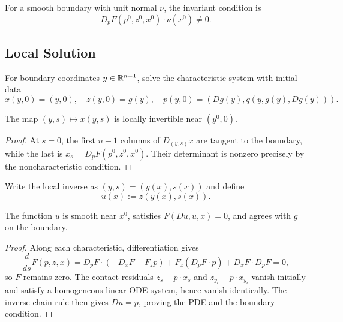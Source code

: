 \begin{remark}
\label{rem:noncharacteristic-condition-general}

For a smooth boundary with unit normal $\nu$, the invariant condition is
\[
D_pF(p^0,z^0,x^0)\cdot\nu(x^0)\ne0.
\]
\end{remark}

\subsection{Local Solution}
\label{sec:characteristics-local-solution}

For boundary coordinates $y\in\mathbb{R}^{n-1}$, solve the characteristic system
with initial data
\[
x(y,0)=(y,0),\quad z(y,0)=g(y),\quad
p(y,0)=(Dg(y),q(y,g(y),Dg(y))).
\]

\begin{lemma}
\label{lem:local-invertibility-characteristics}

The map $(y,s)\mapsto x(y,s)$ is locally invertible near $(y^0,0)$.
\end{lemma}

\begin{proof}
\sketch At $s=0$, the first $n-1$ columns of $D_{(y,s)}x$ are tangent to
the boundary, while the last is
$x_s=D_pF(p^0,z^0,x^0)$. Their determinant is nonzero precisely by the
noncharacteristic condition.
\end{proof}

Write the local inverse as $(y,s)=(y(x),s(x))$ and define
\[
u(x):=z(y(x),s(x)).
\]

\begin{theorem}
\label{thm:local-existence-characteristics}

The function $u$ is smooth near $x^0$, satisfies
$F(Du,u,x)=0$, and agrees with $g$ on the boundary.
\end{theorem}

\begin{proof}
\sketch Along each characteristic, differentiation gives
\[
\frac d{ds}F(p,z,x)=D_pF\cdot(-D_xF-F_zp)
+F_z(D_pF\cdot p)+D_xF\cdot D_pF=0,
\]
so $F$ remains zero. The contact residuals
$z_s-p\cdot x_s$ and $z_{y_i}-p\cdot x_{y_i}$ vanish initially and satisfy
a homogeneous linear ODE system, hence vanish identically. The inverse chain
rule then gives $Du=p$, proving the PDE and the boundary condition.
\end{proof}

